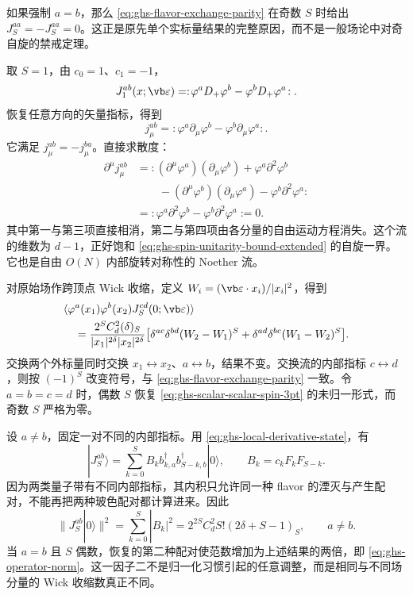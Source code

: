 如果强制 $a=b$，那么 \cref{eq:ghs-flavor-exchange-parity} 在奇数 $S$ 时给出 $J_S^{aa}=-J_S^{aa}=0$。这正是原先单个实标量结果的完整原因，而不是一般场论中对奇自旋的禁戒定理。


取 $S=1$，由 $c_0=1$、$c_1=-1$，
\begin{equation}\label{eq:ghs-flavor-spin-one-current}
 J_1^{ab}(x;\vb\varepsilon)
 =:\!\varphi^aD_+\varphi^b-\varphi^bD_+\varphi^a\!:.
\end{equation}
恢复任意方向的矢量指标，得到
\begin{equation}\label{eq:ghs-on-current}
 j_\mu^{ab}=:\!\varphi^a\partial_\mu\varphi^b-\varphi^b\partial_\mu\varphi^a\!:.
\end{equation}
它满足 $j_\mu^{ab}=-j_\mu^{ba}$。直接求散度：
\begin{align*}
 \partial^\mu j_\mu^{ab}
 &=:\!(\partial^\mu\varphi^a)(\partial_\mu\varphi^b)
 +\varphi^a\partial^2\varphi^b\\
 &\qquad-(\partial^\mu\varphi^b)(\partial_\mu\varphi^a)
 -\varphi^b\partial^2\varphi^a\!:\\
 &=:\!\varphi^a\partial^2\varphi^b-\varphi^b\partial^2\varphi^a\!:=0.
\end{align*}
其中第一与第三项直接相消，第二与第四项由各分量的自由运动方程消失。这个流的维数为 $d-1$，正好饱和 \cref{eq:ghs-spin-unitarity-bound-extended} 的自旋一界。它也是自由 $O(N)$ 内部旋转对称性的 Noether 流。


对原始场作跨顶点 Wick 收缩，定义 $W_i=(\vb\varepsilon\cdot x_i)/|x_i|^2$，得到
\begin{align}\label{eq:ghs-flavor-threepoint}
 &\langle\varphi^a(x_1)\varphi^b(x_2)J_S^{cd}(0;\vb\varepsilon)\rangle\\
 &\quad=\frac{2^SC_d^2(\delta)_S}{|x_1|^{2\delta}|x_2|^{2\delta}}
 \bigl[\delta^{ac}\delta^{bd}(W_2-W_1)^S
 +\delta^{ad}\delta^{bc}(W_1-W_2)^S\bigr].\notag
\end{align}
交换两个外标量同时交换 $x_1\leftrightarrow x_2$、$a\leftrightarrow b$，结果不变。交换流的内部指标 $c\leftrightarrow d$，则按 $(-1)^S$ 改变符号，与 \cref{eq:ghs-flavor-exchange-parity} 一致。令 $a=b=c=d$ 时，偶数 $S$ 恢复 \cref{eq:ghs-scalar-scalar-spin-3pt} 的未归一形式，而奇数 $S$ 严格为零。


设 $a\neq b$，固定一对不同的内部指标。用 \cref{eq:ghs-local-derivative-state}，有
\begin{equation}\label{eq:ghs-flavor-fock-state}
 |J_S^{ab}\rangle
 =\sum_{k=0}^S B_k b_{k,a}^\dagger b_{S-k,b}^\dagger|0\rangle,
 \qquad B_k=c_kF_kF_{S-k}.
\end{equation}
因为两类量子带有不同内部指标，其内积只允许同一种 flavor 的湮灭与产生配对，不能再把两种玻色配对都计算进来。因此
\begin{equation}\label{eq:ghs-flavor-norm}
 \|J_S^{ab}|0\rangle\|^2
 =\sum_{k=0}^S|B_k|^2
 =2^{2S}C_d^2S!(2\delta+S-1)_S,
 \qquad a\ne b.
\end{equation}
当 $a=b$ 且 $S$ 偶数，恢复的第二种配对使范数增加为上述结果的两倍，即 \cref{eq:ghs-operator-norm}。这一因子二不是归一化习惯引起的任意调整，而是相同与不同场分量的 Wick 收缩数真正不同。

